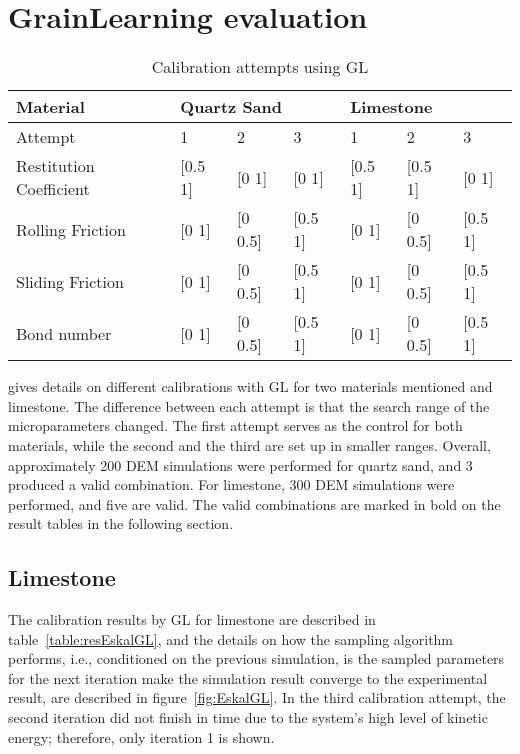 \section{GrainLearning evaluation}\label{section:GLPerformance} 
\begin{table}[H]
    \centering
    \begin{tabular}{l|lll|lll}
    Material                & \multicolumn{3}{l|}{Quartz Sand}       & \multicolumn{3}{l}{Limestone}          \\ \hline
    Attempt                 & 1          & 2           & 3           & 1          & 2           & 3           \\ \hline
    Restitution Coefficient & {[}0.5  1{]} & {[}0  1{]}  & {[}0 1{]}   & {[}0.5  1{]} & {[}0.5  1{]}  & {[}0 1{]}   \\
    Rolling Friction        & {[}0 1{]}  & {[}0 0.5{]} & {[}0.5 1{]} & {[}0 1{]}  & {[}0 0.5{]} & {[}0.5 1{]} \\
    Sliding Friction        & {[}0 1{]}  & {[}0 0.5{]} & {[}0.5 1{]} & {[}0 1{]}  & {[}0 0.5{]} & {[}0.5 1{]} \\
    Bond number             & {[}0 1{]}  & {[}0 0.5{]} & {[}0.5 1{]} & {[}0 1{]}  & {[}0 0.5{]} & {[}0.5 1{]} \\
    \end{tabular}
    \caption{Calibration attempts using GL}\label{table:GLCalibration}
\end{table}
 gives details on different calibrations with GL for two materials mentioned
and limestone. The difference between each attempt is that the search range of the microparameters changed. The first attempt serves as the control for both materials, while the second and the third are set up in smaller ranges. Overall, approximately 200 DEM simulations were performed for quartz sand, and 3 produced a valid combination. For limestone, 300 DEM simulations were performed, and five are valid. The valid combinations are marked in bold on the result tables in the following section.


\subsection{Limestone}
The calibration results by GL for limestone are described in table~\ref{table:resEskalGL}, and the details on how the sampling algorithm performs, i.e., conditioned on the previous simulation, is the sampled parameters for the next iteration make the simulation result converge to the experimental result, are described in figure~\ref{fig:EskalGL}. In the third calibration attempt, the second iteration did not finish in time due to the system's high level of kinetic energy; therefore, only iteration 1 is shown. 

